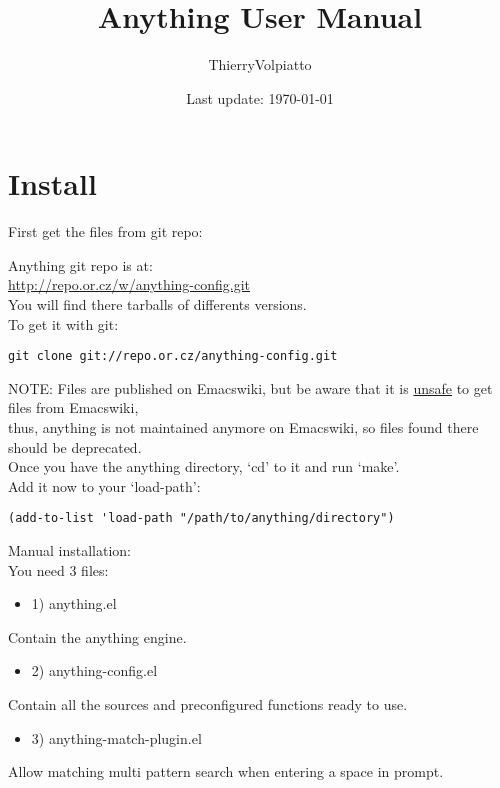 \documentclass[a4paper,11pt]{article}
\begin{document}
\begin{titlepage}
\title{Anything User Manual}
\date{Last update: \today}
\author{ThierryVolpiatto}
\maketitle
\tableofcontents
\end{titlepage}

\section{Install}
\label{sec:install}

First get the files from git repo:

Anything git repo is at:\\
\url{http://repo.or.cz/w/anything-config.git}\\
You will find there tarballs of differents versions.\\

To get it with git:
\begin{verbatim}
git clone git://repo.or.cz/anything-config.git
\end{verbatim}
NOTE: Files are published on Emacswiki, but be aware that it is \underline{unsafe} to get files from Emacswiki,\\
thus, anything is not maintained anymore on Emacswiki, so files found there should be deprecated.\\

Once you have the anything directory, `cd' to it and run `make'.\\
Add it now to your `load-path':
\begin{verbatim}
(add-to-list 'load-path "/path/to/anything/directory")
\end{verbatim}


Manual installation:\\
          
You need 3 files:
\begin{itemize}
\item 1) anything.el
\end{itemize}
Contain the anything engine.

\begin{itemize}
\item 2) anything-config.el
\end{itemize}
Contain all the sources and preconfigured functions ready to use.

\begin{itemize}
\item 3) anything-match-plugin.el
\end{itemize}
Allow matching multi pattern search when entering a space in prompt.
\end{document}
